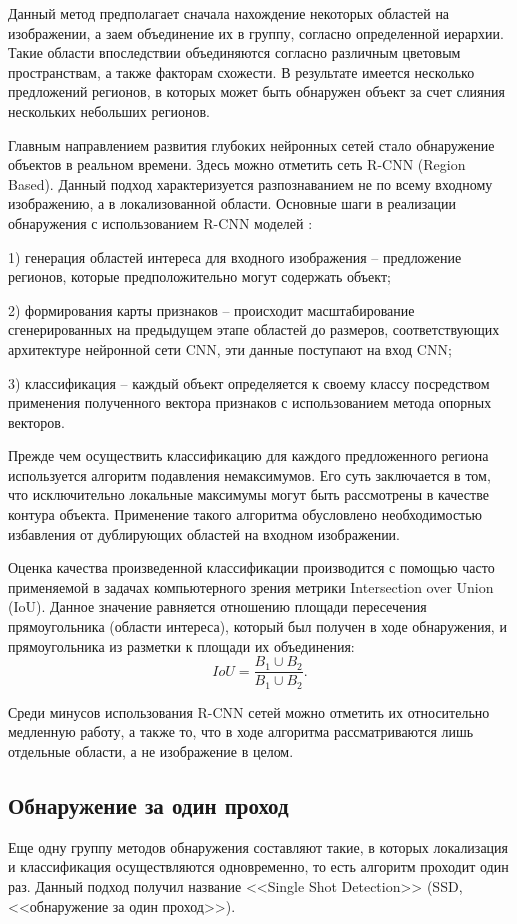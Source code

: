 \documentclass[14pt,a4paper]{extarticle}
\begin{document}
Данный метод предполагает сначала нахождение некоторых областей на изображении, а заем объединение их в группу, согласно определенной иерархии. Такие области впоследствии объединяются согласно различным цветовым пространствам, а также факторам схожести. В результате имеется несколько предложений регионов, в которых может быть обнаружен объект за счет слияния нескольких небольших регионов.

Главным направлением развития глубоких нейронных сетей стало обнаружение объектов в реальном времени. Здесь можно отметить сеть R-CNN (Region Based). Данный подход характеризуется разпознаванием не по всему входному изображению, а в локализованной области. Основные шаги в реализации обнаружения с использованием R-CNN моделей \cite{cnn}:

1) генерация областей интереса для входного изображения -- предложение регионов, которые предположительно могут содержать объект;

2) формирования карты признаков -- происходит масштабирование сгенерированных на предыдущем этапе областей до размеров, соответствующих архитектуре нейронной сети CNN, эти данные поступают на вход CNN;

3) классификация -- каждый объект определяется к своему классу посредством применения полученного вектора признаков с использованием метода опорных векторов.

Прежде чем осуществить классификацию для каждого предложенного региона используется алгоритм подавления немаксимумов. Его суть заключается в том, что исключительно локальные максимумы могут быть рассмотрены в качестве контура объекта. Применение такого алгоритма обусловлено необходимостью избавления от дублирующих областей на входном изображении.

Оценка качества произведенной классификации производится с помощью часто применяемой в задачах компьютерного зрения метрики Intersection over Union (IoU). Данное значение равняется отношению площади пересечения прямоугольника (области интереса), который был получен в ходе обнаружения, и  прямоугольника из разметки к площади их объединения:
\begin{equation}
IoU = \dfrac{B_1 \cup B_2}{B_1 \cup B_2}.
\end{equation}

Среди минусов использования R-CNN сетей можно отметить их относительно медленную работу, а также то, что в ходе алгоритма рассматриваются лишь отдельные области, а не изображение в целом.

\subsection{Обнаружение за один проход}
Еще одну группу методов обнаружения составляют такие, в которых локализация и классификация осуществляются одновременно, то есть алгоритм проходит один раз. Данный подход получил название <<Single Shot Detection>> (SSD, <<обнаружение за один проход>>). 
\end{document}
